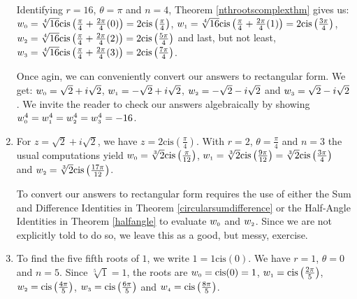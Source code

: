 \documentclass{ximera}
\begin{document}
\begin{ex}
\begin{enumerate}
\smallskip

Identifying $r = 16$, $\theta = \pi$ and $n = 4$,  Theorem \ref{nthrootscomplexthm} gives us:  $w_{\text{\tiny$0$}} = \sqrt[4]{16} \text{cis}\left(\frac{\pi}{4} + \frac{2\pi}{4} (0)\right) = 2\text{cis}\left(\frac{\pi}{4}\right)$, $w_{\text{\tiny$1$}} = \sqrt[4]{16} \text{cis}\left(\frac{\pi}{4} + \frac{2\pi}{4} (1)\right) = 2\text{cis}\left(\frac{3\pi}{4}\right)$, $w_{\text{\tiny$2$}} = \sqrt[4]{16} \text{cis}\left(\frac{\pi}{4} + \frac{2\pi}{4} (2)\right) = 2\text{cis}\left(\frac{5\pi}{4}\right)$ and last, but not least,  $w_{\text{\tiny$3$}} = \sqrt[4]{16} \text{cis}\left(\frac{\pi}{4} + \frac{2\pi}{4} (3)\right) = 2\text{cis}\left(\frac{7\pi}{4}\right)$.  

\smallskip

Once agin, we can conveniently convert our answers to rectangular form. We get:  $w_{\text{\tiny$0$}} = \sqrt{2} + i\sqrt{2}$,  $w_{\text{\tiny$1$}} = -\sqrt{2} + i\sqrt{2}$,  $w_{\text{\tiny$2$}} = -\sqrt{2} - i\sqrt{2}$ and  $w_{\text{\tiny$3$}} = \sqrt{2} - i\sqrt{2}$.  We invite the reader to check  our answers algebraically by showing  $w_{\text{\tiny$0$}}^{4} = w_{\text{\tiny$1$}} ^{4} = w_{\text{\tiny$2$}}^{4}  = w_{\text{\tiny$3$}}^{4} = -16$.

\item  For $z = \sqrt{2} + i \sqrt{2}$, we have $z = 2\text{cis}\left(\frac{\pi}{4}\right)$.  With $r = 2$, $\theta = \frac{\pi}{4}$ and $n =3$ the usual computations yield $w_{\text{\tiny$0$}} = \sqrt[3]{2} \text{cis}\left(\frac{\pi}{12}\right)$,  $w_{\text{\tiny$1$}} = \sqrt[3]{2} \text{cis}\left(\frac{9\pi}{12}\right) = \sqrt[3]{2} \text{cis}\left(\frac{3\pi}{4}\right) $ and  $w_{\text{\tiny$2$}} = \sqrt[3]{2} \text{cis}\left(\frac{17\pi}{12}\right)$. 

\smallskip

 To  convert our answers to rectangular form requires the use of  either the Sum and Difference Identities in Theorem \ref{circularsumdifference} or the Half-Angle Identities in Theorem \ref{halfangle} to evaluate $w_{\text{\tiny$0$}}$ and  $w_{\text{\tiny$2$}}$.  Since we are not explicitly told to do so, we leave this as a good, but messy, exercise.

\item  To find the five fifth roots of $1$, we write $1 = 1 \text{cis}(0)$.  We have $r = 1$, $\theta = 0$ and $n = 5$. Since $\sqrt[5]{1} = 1$, the roots are  $w_{\text{\tiny$0$}} = \text{cis}(0) = 1$, $w_{\text{\tiny$1$}} = \text{cis}\left(\frac{2\pi}{5}\right)$, $w_{\text{\tiny$2$}} = \text{cis}\left(\frac{4\pi}{5}\right)$, $w_{\text{\tiny$3$}} = \text{cis}\left(\frac{6\pi}{5}\right)$ and $w_{\text{\tiny$4$}} = \text{cis}\left(\frac{8\pi}{5}\right)$. 


\end{enumerate}
\end{ex}
\end{document}
